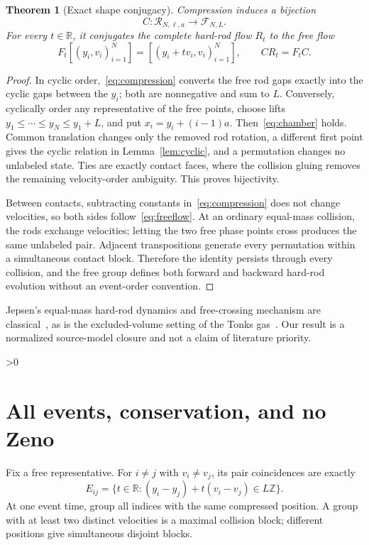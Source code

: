 \documentclass[10pt]{article}
\providecommand{\CRevisionRound}{2}
\newtheorem{theorem}{Theorem}
\newcommand{\R}{\mathbb R}
\newcommand{\Z}{\mathbb Z}
\newcommand{\cF}{\mathcal F}
\newcommand{\cR}{\mathcal R}
\begin{document}
\begin{theorem}[Exact shape conjugacy]\label{thm:conjugacy}
Compression induces a bijection
\[
 C:\cR_{N,\ell,a}\longrightarrow\cF_{N,L}.
\]
For every $t\in\R$, it conjugates the complete hard-rod flow $R_t$ to the free
flow
\begin{equation}\label{eq:freeflow}
 F_t[(y_i,v_i)_{i=1}^N]=[(y_i+t v_i,v_i)_{i=1}^N],
 \qquad C R_t=F_t C.
\end{equation}
\end{theorem}
\begin{proof}
In cyclic order,~\eqref{eq:compression} converts the free rod gaps exactly
into the cyclic gaps between the $y_i$; both are nonnegative and sum to $L$.
Conversely, cyclically order any representative of the free points, choose
lifts $y_1\leq\cdots\leq y_N\leq y_1+L$, and put
$x_i=y_i+(i-1)a$.  Then~\eqref{eq:chamber} holds.  Common translation changes
only the removed rod rotation, a different first point gives the cyclic
relation in Lemma~\ref{lem:cyclic}, and a permutation changes no unlabeled
state.  Ties are exactly contact faces, where the collision gluing removes
the remaining velocity-order ambiguity.  This proves bijectivity.

Between contacts, subtracting constants in~\eqref{eq:compression} does not
change velocities, so both sides follow~\eqref{eq:freeflow}.  At an ordinary
equal-mass collision, the rods exchange velocities; letting the two free
phase points cross produces the same unlabeled pair.  Adjacent
transpositions generate every permutation within a simultaneous contact
block.  Therefore the identity persists through every collision, and the
free group defines both forward and backward hard-rod evolution without an
event-order convention.
\end{proof}

Jepsen's equal-mass hard-rod dynamics and free-crossing mechanism are
classical~\cite{Jepsen1965}, as is the excluded-volume setting of the Tonks
gas~\cite{Tonks1936}.  Our result is a normalized source-model closure and not
a claim of literature priority.

\ifnum\CRevisionRound>0
\section{All events, conservation, and no Zeno}
Fix a free representative.  For $i\ne j$ with $v_i\ne v_j$, its pair
coincidences are exactly
\begin{equation}\label{eq:eventset}
 E_{ij}=\{t\in\R:(y_i-y_j)+t(v_i-v_j)\in L\Z\}.
\end{equation}
At one event time, group all indices with the same compressed position.  A
group with at least two distinct velocities is a maximal collision block;
different positions give simultaneous disjoint blocks.
\end{document}
